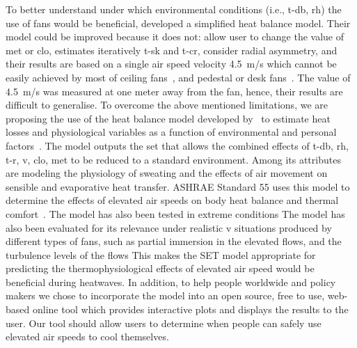 
To better understand under which environmental conditions (i.e., \ac{t-db}, \ac{rh}) the use of fans would be beneficial,  developed a simplified heat balance model.
Their model could be improved because it does not: allow user to change the value of \ac{met} or \ac{clo}, estimates iteratively \ac{t-sk} and \ac{t-cr}, consider radial asymmetry, and their results are based on a single air speed velocity 4.5~m/s which cannot be easily achieved by most of ceiling fans~\cite{Raftery2019}, and pedestal or desk fans~\cite{Yang2015a}.
The value of 4.5~m/s was measured at one meter away from the fan, hence, their results are difficult to generalise.
To overcome the above mentioned limitations, we are proposing the use of the heat balance model developed by~ to estimate heat losses and physiological variables as a function of environmental and personal factors~\cite{Gagge1986}.
The model outputs the \ac{set} that allows the combined effects of \ac{t-db}, \ac{rh}, \ac{t-r}, \ac{v}, \ac{clo}, \ac{met} to be reduced to a standard environment.
Among its attributes are modeling the physiology of sweating and the effects of air movement on sensible and evaporative heat transfer.
ASHRAE Standard 55 uses this model to determine the effects of elevated air speeds on body heat balance and thermal comfort~\cite{ashrae552017}.
The model has also been tested in extreme conditions
The model has also been evaluated for its relevance under realistic \ac{v} situations produced by different types of fans, such as partial immersion in the elevated flows, and the turbulence levels of the flows
This makes the SET model appropriate for predicting the thermophysiological effects of elevated air speed would be beneficial during heatwaves.
In addition, to help people worldwide and policy makers we chose to incorporate the model into an open source, free to use, web-based online tool which provides interactive plots and displays the results to the user.
Our tool should allow users to determine when people can safely use elevated air speeds to cool themselves.
